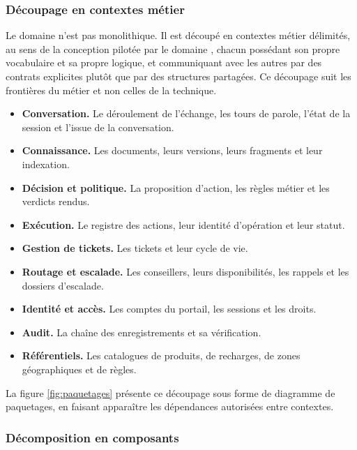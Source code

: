 \subsubsection{Découpage en contextes métier}

Le domaine n'est pas monolithique. Il est découpé en contextes métier délimités, au sens de la conception pilotée par le domaine \cite{evans}, chacun possédant son propre vocabulaire et sa propre logique, et communiquant avec les autres par des contrats explicites plutôt que par des structures partagées. Ce découpage suit les frontières du métier et non celles de la technique.

\begin{itemize}
  \item \textbf{Conversation.} Le déroulement de l'échange, les tours de parole, l'état de la session et l'issue de la conversation.
  \item \textbf{Connaissance.} Les documents, leurs versions, leurs fragments et leur indexation.
  \item \textbf{Décision et politique.} La proposition d'action, les règles métier et les verdicts rendus.
  \item \textbf{Exécution.} Le registre des actions, leur identité d'opération et leur statut.
  \item \textbf{Gestion de tickets.} Les tickets et leur cycle de vie.
  \item \textbf{Routage et escalade.} Les conseillers, leurs disponibilités, les rappels et les dossiers d'escalade.
  \item \textbf{Identité et accès.} Les comptes du portail, les sessions et les droits.
  \item \textbf{Audit.} La chaîne des enregistrements et sa vérification.
  \item \textbf{Référentiels.} Les catalogues de produits, de recharges, de zones géographiques et de règles.
\end{itemize}

La figure \ref{fig:paquetages} présente ce découpage sous forme de diagramme de paquetages, en faisant apparaître les dépendances autorisées entre contextes.


\subsubsection{Décomposition en composants}

